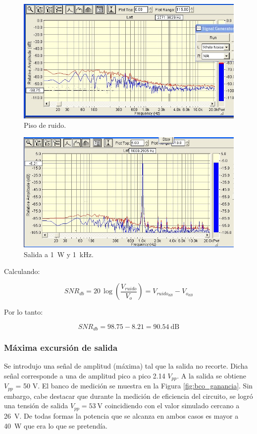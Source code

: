 			\begin{figure}[H]
				\centering
				\includegraphics[scale=0.6]{./Figuras/ruido_balnco.jpg}
			\caption{Piso de ruido.}
			\end{figure}

			\begin{figure}[H]
				\centering
				\includegraphics[scale=0.6]{./Figuras/SNR_1K_1W_imagen2.jpg}
			\caption{Salida a \SI{1}{\W} y \SI{1}{\kHz}.}
			\end{figure}


			Calculando:

			\begin{equation*}
			SNR_{db}  = 20 \, \log\left(\frac{V_{ruido}}{V_o}\right) = V_{ruido_{dB}} - V_{o_{dB}}
			\end{equation*}

			Por lo tanto: 

			\begin{equation*}
				SNR_{db}  = 98.75 - 8.21 = \SI{90.54}{\dB}  
			\end{equation*}
	


		\subsubsection{Máxima excursión de salida}
		Se introdujo una señal de amplitud (máxima) tal que la salida no recorte. Dicha señal corresponde a una
		de amplitud pico a pico 2.14 $V_{pp}$. A la salida se obtiene $V_{pp}$ = 50 V. El banco de medición se muestra en la Figura \ref{fig:bco_ganancia}. Sin embargo, cabe destacar que durante la medición de eficiencia del circuito, se logró una tensión de salida $V_{pp} = \SI{53}{\V}$ coincidiendo con el valor simulado cercano a \SI{26}{\V}. De todas formas la potencia que se alcanza en ambos casos es mayor a \SI{40}{\W} que era lo que se pretendía.

